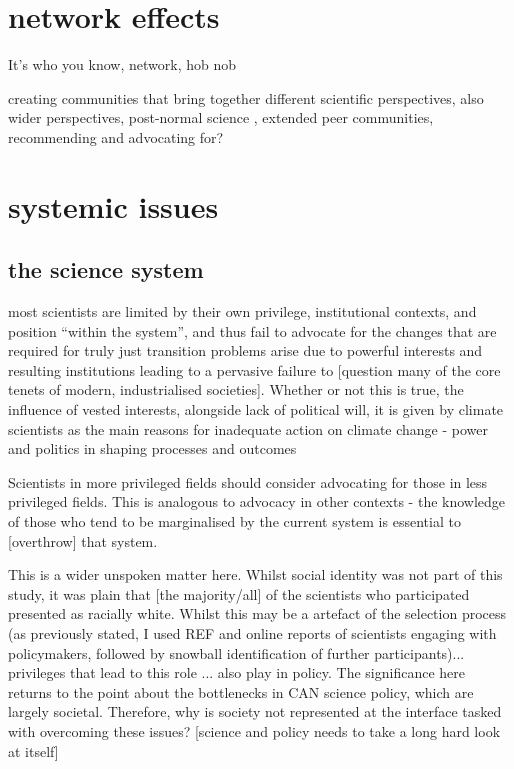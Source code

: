 \section{network effects}
It's who you know, network, hob nob

creating communities that bring together different scientific perspectives, also wider perspectives, post-normal science \cite{FuntowiczR1993}, extended peer communities, \cite{Jasanoff2003} recommending and advocating for?

\section{systemic issues}
\subsection{the science system}
\cite{Bendell2024} most scientists are limited by their own privilege, institutional contexts, and position ``within the system'', and thus fail to advocate for the changes that are required for truly just transition  
\cite{StoddardEtAl2021} problems arise due to powerful interests and resulting institutions leading to a pervasive failure to [question many of the core tenets of modern, industrialised societies]. Whether or not this is true, the influence of vested interests, alongside lack of political will, it is given by climate scientists as the main reasons for inadequate action on climate change \cite{Carrington2024} 
\cite{TurnhoutMWKL2020} - power and politics in shaping processes and outcomes

Scientists in more privileged fields should consider advocating for those in less privileged fields. This is analogous to advocacy in other contexts - the knowledge of those who tend to be marginalised by the current system is essential to [overthrow] that system.

This is a wider unspoken matter here. Whilst social identity was not part of this study, it was plain that [the majority/all] of the scientists who participated presented as racially white. Whilst this may be a artefact of the selection process (as previously stated, I used REF and online reports of scientists engaging with policymakers, followed by snowball identification of further participants)... privileges that lead to this role ... also play in policy. The significance here returns to the point about the bottlenecks in CAN science policy, which are largely societal. Therefore, why is society not represented at the interface tasked with overcoming these issues? [science and policy needs to take a long hard look at itself]

